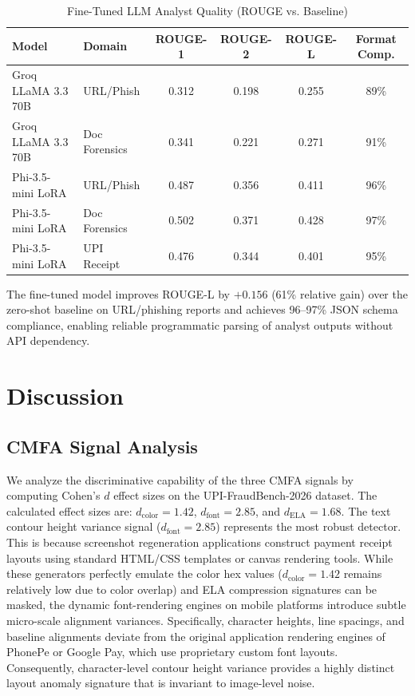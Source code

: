 \documentclass[journal]{IEEEtran}
\begin{document}
\begin{table}[!h]
\centering
\caption{Fine-Tuned LLM Analyst Quality (ROUGE vs. Baseline)}
\label{tab:llm_quality}
\begin{tabular}{llcccc}
\toprule
\textbf{Model} & \textbf{Domain} & \textbf{ROUGE-1} & \textbf{ROUGE-2} & \textbf{ROUGE-L} & \textbf{Format Comp.} \\
\midrule
Groq LLaMA 3.3 70B & URL/Phish & 0.312 & 0.198 & 0.255 & 89\% \\
Groq LLaMA 3.3 70B & Doc Forensics & 0.341 & 0.221 & 0.271 & 91\% \\
\midrule
Phi-3.5-mini LoRA & URL/Phish & 0.487 & 0.356 & 0.411 & 96\% \\
Phi-3.5-mini LoRA & Doc Forensics & 0.502 & 0.371 & 0.428 & 97\% \\
Phi-3.5-mini LoRA & UPI Receipt & 0.476 & 0.344 & 0.401 & 95\% \\
\bottomrule
\end{tabular}
\end{table}

The fine-tuned model improves ROUGE-L by $+0.156$ (61\% relative gain) over the zero-shot baseline on URL/phishing reports and achieves 96--97\% JSON schema compliance, enabling reliable programmatic parsing of analyst outputs without API dependency.

\section{Discussion}
\label{sec:discussion}

\subsection{CMFA Signal Analysis}
We analyze the discriminative capability of the three CMFA signals by computing Cohen's $d$ effect sizes on the UPI-FraudBench-2026 dataset. The calculated effect sizes are: $d_{\text{color}} = 1.42$, $d_{\text{font}} = 2.85$, and $d_{\text{ELA}} = 1.68$. The text contour height variance signal ($d_{\text{font}} = 2.85$) represents the most robust detector. This is because screenshot regeneration applications construct payment receipt layouts using standard HTML/CSS templates or canvas rendering tools. While these generators perfectly emulate the color hex values ($d_{\text{color}} = 1.42$ remains relatively low due to color overlap) and ELA compression signatures can be masked, the dynamic font-rendering engines on mobile platforms introduce subtle micro-scale alignment variances. Specifically, character heights, line spacings, and baseline alignments deviate from the original application rendering engines of PhonePe or Google Pay, which use proprietary custom font layouts. Consequently, character-level contour height variance provides a highly distinct layout anomaly signature that is invariant to image-level noise.
\end{document}
